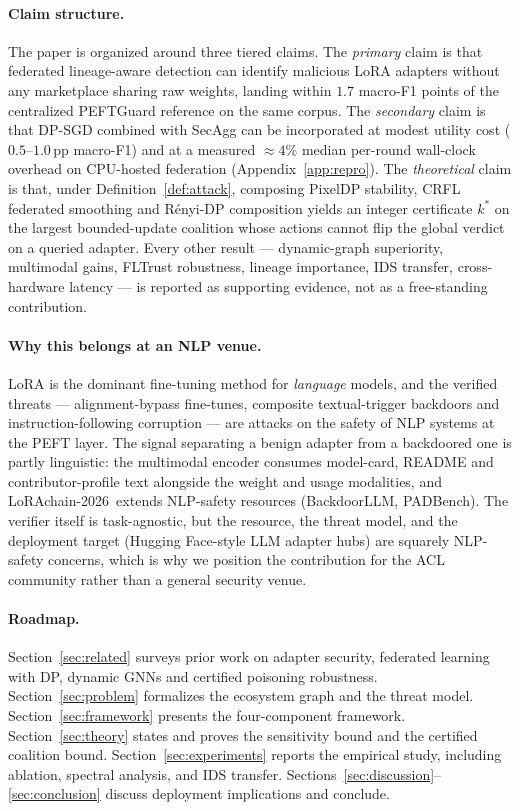 \documentclass[11pt]{article}
\theoremstyle{plain}
\theoremstyle{definition}
\theoremstyle{remark}
\newcommand{\benchname}{LoRAchain-2026}
\begin{document}
\paragraph{Claim structure.}
The paper is organized around three tiered claims. The
\emph{primary} claim is that federated lineage-aware detection
can identify malicious LoRA adapters without any marketplace
sharing raw weights, landing within $1.7$ macro-F1 points of the
centralized PEFTGuard reference on the same corpus. The
\emph{secondary} claim is that DP-SGD combined with SecAgg can be
incorporated at modest utility cost ($0.5$--$1.0$\,pp macro-F1)
and at a measured ${\approx}4\%$ median per-round wall-clock
overhead on CPU-hosted federation
(Appendix~\ref{app:repro}). The \emph{theoretical} claim is that,
under Definition~\ref{def:attack}, composing PixelDP stability,
CRFL federated smoothing and R\'enyi-DP composition yields an
integer certificate $k^*$ on the largest bounded-update coalition
whose actions cannot flip the global verdict on a queried
adapter. Every other result --- dynamic-graph superiority,
multimodal gains, FLTrust robustness, lineage importance, IDS
transfer, cross-hardware latency --- is reported as supporting
evidence, not as a free-standing contribution.

\paragraph{Why this belongs at an NLP venue.}
LoRA is the dominant fine-tuning method for \emph{language}
models, and the verified threats --- alignment-bypass fine-tunes,
composite textual-trigger backdoors and instruction-following
corruption --- are attacks on the safety of NLP systems at the
PEFT layer. The signal separating a benign adapter from a
backdoored one is partly linguistic: the multimodal encoder
consumes model-card, README and contributor-profile text
alongside the weight and usage modalities, and \benchname\
extends NLP-safety resources (BackdoorLLM, PADBench). The
verifier itself is task-agnostic, but the resource, the threat
model, and the deployment target (Hugging Face-style LLM adapter
hubs) are squarely NLP-safety concerns, which is why we position
the contribution for the ACL community rather than a general
security venue.

\paragraph{Roadmap.}
Section~\ref{sec:related} surveys prior work on adapter security,
federated learning with DP, dynamic GNNs and certified poisoning
robustness. Section~\ref{sec:problem} formalizes the ecosystem
graph and the threat model. Section~\ref{sec:framework} presents
the four-component framework. Section~\ref{sec:theory} states
and proves the sensitivity bound and the certified coalition
bound. Section~\ref{sec:experiments} reports the empirical
study, including ablation, spectral analysis, and IDS transfer.
Sections~\ref{sec:discussion}--\ref{sec:conclusion} discuss
deployment implications and conclude.
\end{document}
